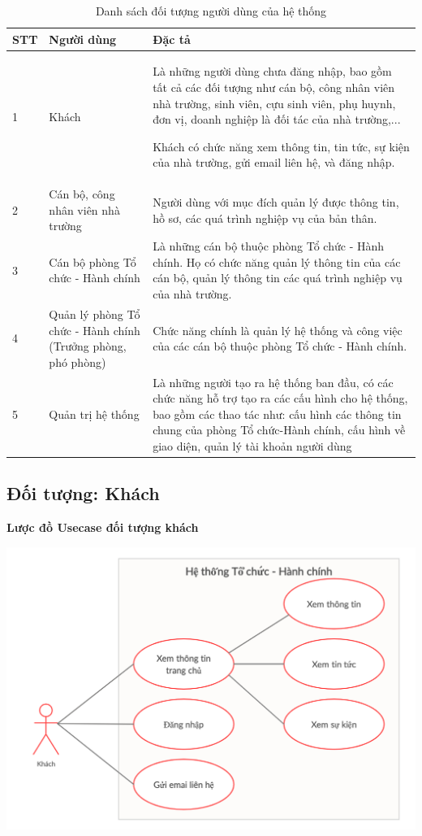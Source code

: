 \begin{table}[H]
    \centering
	\begin{tabular}{|p{1cm}|p{4cm}|p{10cm}|}
    \hline
    \textbf{STT}&\textbf{Người dùng}&\textbf{Đặc tả}\\
    \hline
    1&Khách&Là những người dùng chưa đăng nhập, bao gồm tất cả các đối tượng như cán bộ,  công nhân viên nhà trường, sinh viên, cựu sinh viên, phụ huynh, đơn vị, doanh nghiệp là đối tác của nhà trường,...
    
    Khách có chức năng xem thông tin, tin tức, sự kiện của nhà trường, gửi email liên hệ, và đăng nhập.\\
    \hline
	2&Cán bộ, công nhân viên nhà trường&Người dùng với mục đích quản lý được thông tin, hồ sơ, các quá trình nghiệp vụ của bản thân.\\
	\hline
    3&Cán bộ phòng Tổ chức - Hành chính&Là những cán bộ thuộc phòng Tổ chức - Hành chính. Họ có chức năng quản lý thông tin của các cán bộ, quản lý thông tin các quá trình nghiệp vụ của nhà trường.\\
    \hline
    4&Quản lý phòng Tổ chức - Hành chính (Trưởng phòng, phó phòng) &Chức năng chính là quản lý hệ thống và công việc của các cán bộ thuộc phòng Tổ chức - Hành chính. \\
	\hline
    5&Quản trị hệ thống&Là những người tạo ra hệ thống ban đầu, có các chức năng hỗ trợ tạo ra các cấu hình cho hệ thống, bao gồm các thao tác như: cấu hình các thông tin chung của phòng Tổ chức-Hành chính, cấu hình về giao diện, quản lý tài khoản người dùng\\
	\hline
\end{tabular}
\caption{Danh sách đối tượng người dùng của hệ thống}
\end{table}
\subsection{Đối tượng: Khách}
\textbf{Lược đồ Usecase đối tượng khách}
\begin{center}
  \captionsetup{type=figure}
  \includegraphics[width=15cm]{img/usecase/guest.png}
\end{center}

